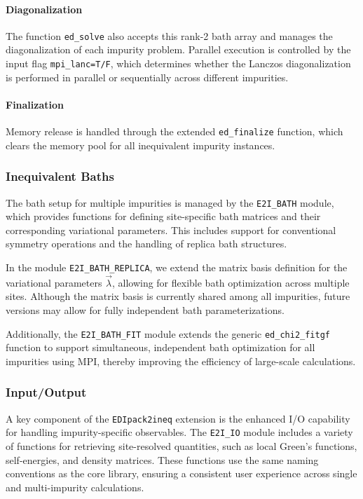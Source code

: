 \documentclass[edipack2.tex]{subfiles}
\begin{document}
\paragraph{\bf Diagonalization} The function {\tt ed\_solve} also accepts this 
  rank-2 bath array and manages the diagonalization of each impurity 
  problem. Parallel execution is controlled by the input flag 
  {\tt mpi\_lanc=T/F}, which determines whether the Lanczos 
  diagonalization is performed in parallel or sequentially across 
  different impurities.

\paragraph{\bf Finalization} Memory release is handled through the extended 
{\tt ed\_finalize} function, which clears the memory pool for all 
inequivalent impurity instances.

  


\subsubsection{Inequivalent Baths}\label{ssSecIneqBath}
The bath setup for multiple impurities is managed by the 
{\tt E2I\_BATH} module, which provides functions for defining 
site-specific bath matrices and their corresponding variational 
parameters. This includes support for conventional symmetry operations 
and the handling of replica bath structures. 

In the module {\tt E2I\_BATH\_REPLICA}, we extend the 
matrix basis definition for the variational parameters 
$\vec{\lambda}$, allowing for flexible bath optimization across 
multiple sites. Although the matrix basis is currently shared among 
all impurities, future versions may allow for fully independent 
bath parameterizations.

Additionally, the {\tt E2I\_BATH\_FIT} module extends the generic 
{\tt ed\_chi2\_fitgf} function to support simultaneous, independent 
bath optimization for all impurities using MPI, thereby improving the 
efficiency of large-scale calculations.


 
\subsubsection{Input/Output}\label{ssSecIneqIO}
A key component of the {\tt EDIpack2ineq} extension is the 
enhanced I/O capability for handling impurity-specific observables. 
The {\tt E2I\_IO} module includes a variety of functions for 
retrieving site-resolved quantities, such as local Green's functions, 
self-energies, and density matrices. These functions use the same 
naming conventions as the core \NAME library, ensuring a consistent 
user experience across single and multi-impurity calculations.
\end{document}

